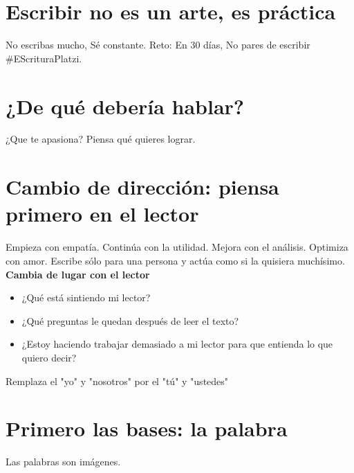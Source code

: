 \documentclass{article}
\begin{document}
    \section{Escribir no es un arte, es práctica}
    No escribas mucho, Sé constante.
    Reto: En 30 días, No pares de escribir #EScrituraPlatzi. 
    \section{¿De qué debería hablar?}
    ¿Que te apasiona? Piensa qué quieres lograr. 
    \section{Cambio de dirección: piensa primero en el lector}
    Empieza con empatía. Continúa con la utilidad. Mejora con el análisis. Optimiza con amor.
    Escribe sólo para una persona y actúa como si la quisiera muchísimo. \\ 
    \textbf{Cambia de lugar con el lector}
    \begin{itemize}
    \item ¿Qué está sintiendo mi lector?
    \item ¿Qué preguntas le quedan después de leer el texto?
    \item ¿Estoy haciendo trabajar demasiado a mi lector para que entienda lo que quiero decir?
    \end{itemize}
    Remplaza el "yo" y "nosotros" por el "tú" y "ustedes"
    \section{Primero las bases: la palabra}
    Las palabras son imágenes. 
\end{document}
